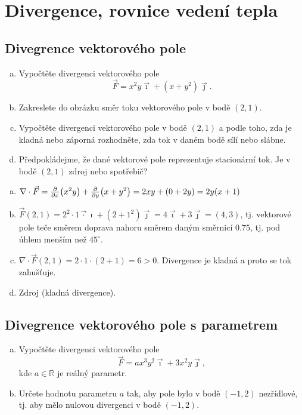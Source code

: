 \stranka
\section{Divergence, rovnice vedení tepla}


\subsection{Divegrence vektorového pole}

\begin{enumerate}[a)]
\item Vypočtěte divergenci vektorového pole
  $$\vec F=x^2y\vec \imath + (x+y^2)\vec \jmath.$$
\item Zakreslete do obrázku směr toku vektorového pole v bodě $(2,1)$. 
\item Vypočtěte divergenci vektorového pole v bodě $(2,1)$ a podle toho, zda je kladná nebo záporná rozhodněte, zda tok v daném bodě sílí nebo slábne.
\item Předpokládejme, že dané vektorové pole reprezentuje stacionární tok. Je v bodě $(2,1)$ zdroj nebo spotřebič?
\end{enumerate}
\reseni

\begin{enumerate}[a)]
\item $\nabla \cdot \vec F=\pdv{x}(x^2y)+\pdv{y}(x+y^2)
=2xy+(0+2y)=2y(x+1)$
\item $\vec F(2,1)=2^2\cdot 1\vec \cdot \imath + (2+1^2)\vec \jmath=4\vec\imath+3\vec\jmath=(4,3)$, tj. vektorové pole teče směrem doprava nahoru směrem daným směrnicí $0.75$, tj. pod úhlem menším než $45^\circ$.
\item $\nabla\cdot\vec F(2,1)=2\cdot 1 \cdot(2+1)=6>0$. Divergence je kladná a proto se tok zahušťuje.
\item Zdroj (kladná divergence).
\end{enumerate}
\konec

\subsection{Divegrence vektorového pole s parametrem}

\begin{enumerate}[a)]
\item Vypočtěte divergenci vektorového pole
  $$\vec F=ax^3y^2\vec \imath + 3x^2y\vec \jmath,$$ kde
  $a\in\mathbb R$ je reálný parametr.
\item Určete hodnotu parametru $a$ tak, aby pole bylo v bodě $(-1,2)$ nezřídlové, tj. aby mělo nulovou divergenci v bodě $(-1,2)$.
\end{enumerate}
\reseni

